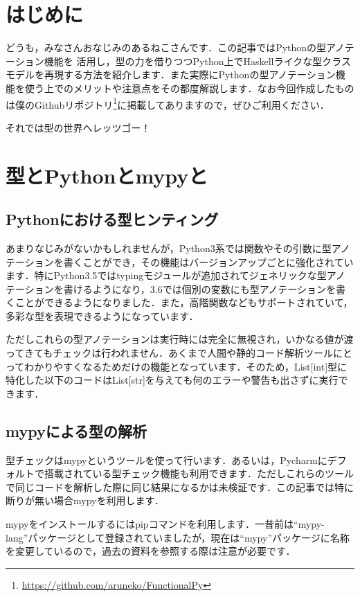 \section{はじめに}
どうも，みなさんおなじみのあるねこさんです．この記事ではPythonの型アノテーション機能を
活用し，型の力を借りつつPython上でHaskellライクな型クラスモデルを再現する方法を紹介します．また実際にPythonの型アノテーション機能を使う上でのメリットや注意点をその都度解説します．なお今回作成したものは僕のGithubリポジトリ\footnote{\url{https://github.com/aruneko/FunctionalPy}}に掲載してありますので，ぜひご利用ください．

それでは型の世界へレッツゴー！

\section{型とPythonとmypyと}
\subsection{Pythonにおける型ヒンティング}
あまりなじみがないかもしれませんが，Python3系では関数やその引数に型アノテーションを書くことができ，その機能はバージョンアップごとに強化されています．特にPython3.5ではtypingモジュールが追加されてジェネリックな型アノテーションを書けるようになり，3.6では個別の変数にも型アノテーションを書くことができるようになりました．また，高階関数などもサポートされていて，多彩な型を表現できるようになっています．

ただしこれらの型アノテーションは実行時には完全に無視され，いかなる値が渡ってきてもチェックは行われません．あくまで人間や静的コード解析ツールにとってわかりやすくなるためだけの機能となっています．そのため，List[int]型に特化した以下のコードはList[str]を与えても何のエラーや警告も出さずに実行できます．


\subsection{mypyによる型の解析}
型チェックはmypyというツールを使って行います．あるいは，Pycharmにデフォルトで搭載されている型チェック機能も利用できます．ただしこれらのツールで同じコードを解析した際に同じ結果になるかは未検証です．この記事では特に断りが無い場合mypyを利用します．

mypyをインストールするにはpipコマンドを利用します．一昔前は``mypy-lang''パッケージとして登録されていましたが，現在は``mypy''パッケージに名称を変更しているので，過去の資料を参照する際は注意が必要です．

